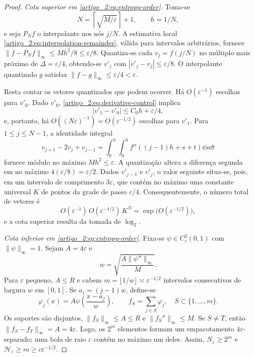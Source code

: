 \begin{proof}
\emph{Cota superior em \eqref{artigo_2:eq:entropy-order}.} Toma-se
\[
 N=\left\lceil\sqrt{M/\varepsilon}\right\rceil+1,\qquad h=1/N,
\]
e seja $P_Nf$ o interpolante nos nós $j/N$. A estimativa local \eqref{artigo_2:eq:interpolation-remainder}, válida para intervalos arbitrários, fornece $\|f-P_Nf\|_\infty\le Mh^2/8\le\varepsilon/8$. Quantiza-se cada $v_j=f(j/N)$ no múltiplo mais próximo de $\Delta=\varepsilon/4$, obtendo-se $v'_j$ com $|v'_j-v_j|\le\varepsilon/8$. O interpolante quantizado $g$ satisfaz $\|f-g\|_\infty\le\varepsilon/4<\varepsilon$.

Resta contar os vetores quantizados que podem ocorrer. Há $O(\varepsilon^{-1})$ escolhas para $v'_0$. Dado $v'_0$, \eqref{artigo_2:eq:derivative-control} implica
\[
 |v'_1-v'_0|\le C_0h+\varepsilon/4,
\]
e, portanto, há $O((N\varepsilon)^{-1})=O(\varepsilon^{-1/2})$ escolhas para $v'_1$. Para $1\le j\le N-1$, a identidade integral
\[
 v_{j+1}-2v_j+v_{j-1}
 =\int_0^h\int_0^h
 f''((j-1)h+s+t)\dd s\dd t
\]
fornece módulo no máximo $Mh^2\le\varepsilon$. A quantização altera a diferença segunda em no máximo $4(\varepsilon/8)=\varepsilon/2$. Dados $v'_{j-1}$ e $v'_j$, o valor seguinte situa-se, pois, em um intervalo de comprimento $3\varepsilon$, que contém no máximo uma constante universal $K$ de pontos da grade de passo $\varepsilon/4$. Consequentemente, o número total de vetores é
\[
 O(\varepsilon^{-1})\,O(\varepsilon^{-1/2})\,K^N
 =\exp\bigl(O(\varepsilon^{-1/2})\bigr),
\]
e a cota superior resulta da tomada de $\log_2$.

\emph{Cota inferior em \eqref{artigo_2:eq:entropy-order}.} Fixa-se $\psi\in C_c^2(0,1)$ com $\|\psi\|_\infty=1$. Sejam $A=4\varepsilon$ e
\[
 w=\sqrt{\frac{A\|\psi''\|_\infty}{M}}.
\]
Para $\varepsilon$ pequeno, $A\le R$ e cabem $m=\lfloor1/w\rfloor\asymp\varepsilon^{-1/2}$ intervalos consecutivos de largura $w$ em $[0,1]$. Se $a_j=(j-1)w$, define-se
\[
 \varphi_j(x)=A\psi\!\left(\frac{x-a_j}{w}\right),\qquad
 f_S=\sum_{j\in S}\varphi_j,\quad S\subset\{1,\ldots,m\}.
\]
Os suportes são disjuntos, $\|f_S\|_\infty\le A\le R$ e $\|f_S''\|_\infty\le M$. Se $S\neq T$, então $\|f_S-f_T\|_\infty=A=4\varepsilon$. Logo, os $2^m$ elementos formam um empacotamento $4\varepsilon$-separado; uma bola de raio $\varepsilon$ contém no máximo um deles. Assim, $N_\varepsilon\ge2^m$ e $\mathcal{H}_\varepsilon\ge m\ge c\varepsilon^{-1/2}$.


\end{proof}
